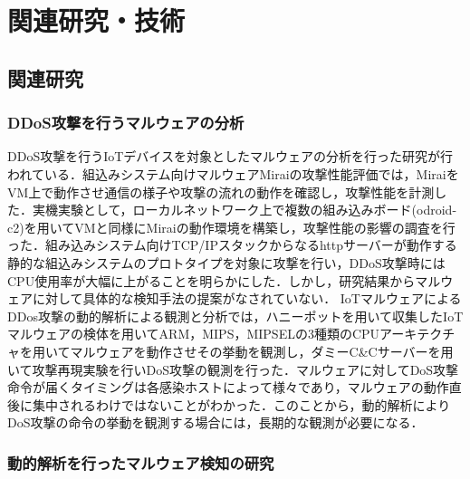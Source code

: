 \chapter{関連研究・技術}
 
\section{関連研究}

\subsection{DDoS攻撃を行うマルウェアの分析}
DDoS攻撃を行うIoTデバイスを対象としたマルウェアの分析を行った研究が行われている．組込みシステム向けマルウェアMiraiの攻撃性能評価\cite{攻撃性能評価を行った研究}では，MiraiをVM上で動作させ通信の様子や攻撃の流れの動作を確認し，攻撃性能を計測した．実機実験として，ローカルネットワーク上で複数の組み込みボード(odroid-c2)を用いてVMと同様にMiraiの動作環境を構築し，攻撃性能の影響の調査を行った．組み込みシステム向けTCP/IPスタックからなるhttpサーバーが動作する静的な組込みシステムのプロトタイプを対象に攻撃を行い，DDoS攻撃時にはCPU使用率が大幅に上がることを明らかにした．しかし，研究結果からマルウェアに対して具体的な検知手法の提案がなされていない．
IoTマルウェアによるDDos攻撃の動的解析による観測と分析\cite{観測と分析}では，ハニーポットを用いて収集したIoTマルウェアの検体を用いてARM，MIPS，MIPSELの3種類のCPUアーキテクチャを用いてマルウェアを動作させその挙動を観測し，ダミーC\&Cサーバーを用いて攻撃再現実験を行いDoS攻撃の観測を行った．マルウェアに対してDoS攻撃命令が届くタイミングは各感染ホストによって様々であり，マルウェアの動作直後に集中されるわけではないことがわかった．このことから，動的解析によりDoS攻撃の命令の挙動を観測する場合には，長期的な観測が必要になる．

\subsection{動的解析を行ったマルウェア検知の研究} %

